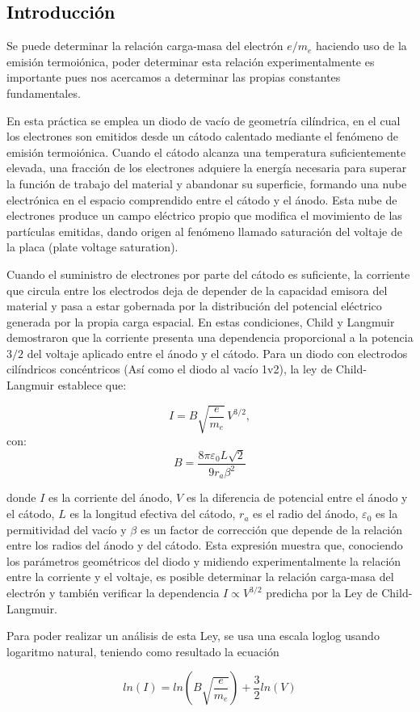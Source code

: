 \textcolor{black}{\section{Introducción}}
\noindent
Se puede determinar la relación carga-masa del electrón $e/m_e$ haciendo uso de la emisión termoiónica, poder determinar esta relación experimentalmente es importante pues nos acercamos a determinar las propias constantes fundamentales.

En esta práctica se emplea un diodo de vacío de geometría cilíndrica, en el cual los electrones son emitidos desde un cátodo calentado mediante el fenómeno de emisión termoiónica. Cuando el cátodo alcanza una temperatura suficientemente elevada, una fracción de los electrones adquiere la energía necesaria para superar la función de trabajo del material y abandonar su superficie, formando una nube electrónica en el espacio comprendido entre el cátodo y el ánodo. Esta nube de electrones produce un campo eléctrico propio que modifica el movimiento de las partículas emitidas, dando origen al fenómeno llamado saturación del voltaje de la placa (plate voltage saturation). \cite{Angiolillo}
 

Cuando el suministro de electrones por parte del cátodo es suficiente, la corriente que circula entre los electrodos deja de depender de la capacidad emisora del material y pasa a estar gobernada por la distribución del potencial eléctrico generada por la propia carga espacial. En estas condiciones, Child y Langmuir demostraron que la corriente presenta una dependencia proporcional a la potencia $3/2$ del voltaje aplicado entre el ánodo y el cátodo. Para un diodo con electrodos cilíndricos concéntricos (Así como el diodo al vacío 1v2), la ley de Child-Langmuir establece que:

\begin{equation}
	I=
	B
	\sqrt{\frac{e}{m_e}}
	\,V^{3/2},
\end{equation}
con:
 \begin{equation}
 	B = \frac{8\pi\varepsilon_0L \sqrt{2}}{9r_a\beta^2}
 \end{equation}
 
donde $I$ es la corriente del ánodo, $V$ es la diferencia de potencial entre el ánodo y el cátodo, $L$ es la longitud efectiva del cátodo, $r_a$ es el radio del ánodo, $\varepsilon_0$ es la permitividad del vacío y $\beta$ es un factor de corrección que depende de la relación entre los radios del ánodo y del cátodo. Esta expresión muestra que, conociendo los parámetros geométricos del diodo y midiendo experimentalmente la relación entre la corriente y el voltaje, es posible determinar la relación carga-masa del electrón y también verificar la dependencia $I\propto V^{3/2}$ predicha por la Ley de Child-Langmuir. \cite{Angiolillo}

Para poder realizar un análisis de esta Ley, se usa una escala loglog usando logaritmo natural, teniendo como resultado la ecuación

\begin{equation}
	ln(I) = ln\left( B \sqrt{\frac{e}{m_e}} \right) + \frac{3}{2}ln(V)
	\label{eq:loglog}
\end{equation}

\noindent 
